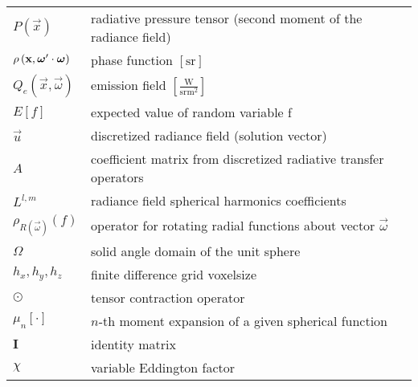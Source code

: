 \begin{flushleft}
\begin{longtable}[c]{@{}p{28.5mm}@{} p{120.5mm}}
	\\
	$P\left(\vec{x}\right)$	&  radiative pressure tensor (second moment of the radiance field)
	\\
	$\rho\left(\boldsymbol{\mathbf{x}}, \boldsymbol{\mathbf{\omega}}'\cdot\boldsymbol{\mathbf{\omega}}\right)$	&  phase function $\left[\si{\steradian}\right]$
	\\
	$Q_e\left(\vec{x}, \vec{\omega}\right)$	&  emission field $\left[\frac{\si{\watt}}{\si{\steradian} \si{\meter}^2}\right]$
	\\
	$E\left[f\right]$	&  expected value of random variable f
	\\
	$\vec{u}$	&  discretized radiance field (solution vector)
	\\
	$A$	&  coefficient matrix from discretized radiative transfer operators
	\\
	$L^{l,m}$	&  radiance field spherical harmonics coefficients
	\\
	$\rho_{R\left(\vec{\omega}\right)}\left(f\right)$	&  operator for rotating radial functions about vector $\vec{\omega}$
	\\
	$\Omega$	&  solid angle domain of the unit sphere
	\\
	$h_x, h_y, h_z$	&  finite difference grid voxelsize
	\\
	$\odot$	&  tensor contraction operator
	\\
	$\mu_n\left[\cdot\right]$	&  $n$-th moment expansion of a given spherical function
	\\
	$\mathbf{I}$	&  identity matrix
	\\
	$\chi$	&  variable Eddington factor
\end{longtable}
\end{flushleft}
%
%